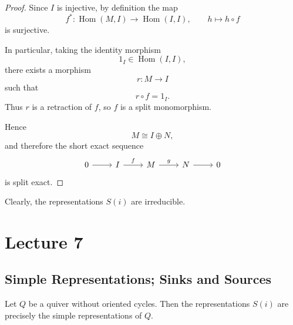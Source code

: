 \documentclass[11pt, a4paper]{report}
\begin{document}
\begin{proof}
    Since $I$ is injective, by definition the map
    \[
        f^*:\operatorname{Hom}(M,I)\longrightarrow \operatorname{Hom}(I,I),
        \qquad h\longmapsto h\circ f
    \]
    is surjective.

    In particular, taking the identity morphism
    \[
        1_I\in \operatorname{Hom}(I,I),
    \]
    there exists a morphism
    \[
        r:M\to I
    \]
    such that
    \[
        r\circ f=1_I.
    \]
    Thus $r$ is a retraction of $f$, so $f$ is a split monomorphism.

    Hence
    \[
        M\cong I\oplus N,
    \]
    and therefore the short exact sequence
    \[
        \begin{tikzcd}
            0 \arrow[r] & I \arrow[r, "f"] & M \arrow[r, "g"] & N \arrow[r] & 0
        \end{tikzcd}
    \]
    is split exact.
\end{proof}

Clearly, the representations $S(i)$ are irreducible.

\chapter{Lecture 7}

\section{Simple Representations; Sinks and Sources}

\begin{proposition}
    Let $Q$ be a quiver without oriented cycles. Then the representations $S(i)$ are precisely the simple representations of $Q$.
\end{proposition}
\end{document}
